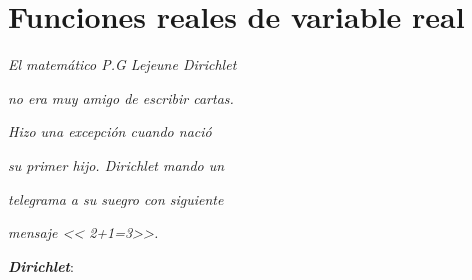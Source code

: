 
\chapter{Funciones reales de variable real}

\PartialToc

\hypersetup{linkcolor=ptctitle}

\vspace*{0.5cm}
 
\begin{flushright}
\textit{\footnotesize{}El matemático P.G Lejeune Dirichlet }
\par\end{flushright}{\footnotesize \par}

\begin{flushright}
\textit{\footnotesize{}no era muy amigo de escribir cartas.}
\par\end{flushright}{\footnotesize \par}

\begin{flushright}
\textit{\footnotesize{}Hizo una excepción cuando nació }
\par\end{flushright}{\footnotesize \par}

\begin{flushright}
\textit{\footnotesize{}su primer hijo. Dirichlet mando un }
\par\end{flushright}{\footnotesize \par}

\begin{flushright}
\textit{\footnotesize{}telegrama a su suegro con siguiente }
\par\end{flushright}{\footnotesize \par}

\begin{flushright}
\textit{\footnotesize{}mensaje << 2+1=3>>. }
\par\end{flushright}{\footnotesize \par}

\begin{flushright}
{\small{} }\textbf{\textit{Dirichlet}}: 
\par\end{flushright}

